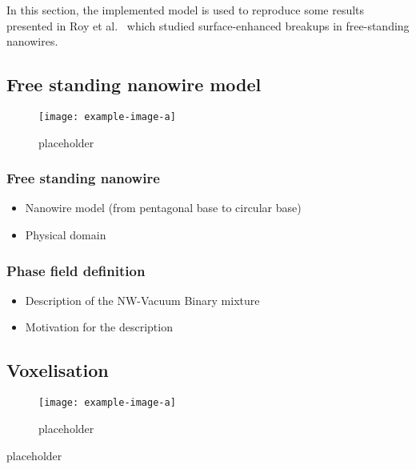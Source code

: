 \label{chap:2_4-nanowire}
In this section, the implemented model is used to reproduce some results presented in Roy et al.\ \cite{RoyVarmaGururajan2021} which studied surface-enhanced breakups in free-standing nanowires.
\subsection{Free standing nanowire model}
\begin{figure}[H]
    \centering
    \texttt{[image: example-image-a]}
    \caption{placeholder}
    \label{fig:2-free-standing-nw}
\end{figure}
    \subsubsection{Free standing nanowire}
    \begin{itemize}
        \item Nanowire model (from pentagonal base to circular base)
        \item Physical domain
    \end{itemize}
    \subsubsection{Phase field definition}
    \begin{itemize}
        \item Description of the NW-Vacuum Binary mixture
        \item Motivation for the description
    \end{itemize}
\subsection{Voxelisation}
    \begin{figure}[H]
        \centering
        \texttt{[image: example-image-a]}
        \caption{placeholder}
        \label{fig:2-voxels}
    \end{figure}
    placeholder
